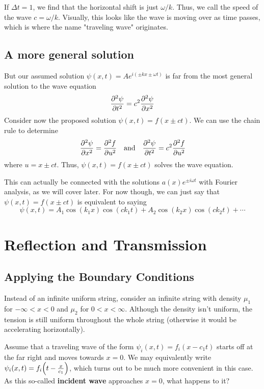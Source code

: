 If $\Delta t=1$, we find that the horizontal shift is just $\omega/k$. Thus, we call the speed of the wave $c = \omega/k$. Visually, this looks like the wave is moving over as time passes, which is where the name "traveling wave" originates.
\subsection*{A more general solution}
But our assumed solution $\psi(x,t) = Ae^{i(\pm kx \pm \omega t)}$ is far from the most general solution to the wave equation
\[ \pdv[2]{\psi}{t} = c^2 \pdv[2]{\psi}{x} \]
Consider now the proposed solution $\psi(x,t) = f(x \pm ct)$. We can use the chain rule to determine
\[ \pdv[2]{\psi}{x} = \pdv[2]{f}{u} \quad\text{and} \quad \pdv[2]{\psi}{t} = c^2\pdv[2]{f}{u}\]
where $u = x\pm ct$. Thus, $\psi(x,t) = f(x \pm ct)$ solves the wave equation.

This can actually be connected with the solutions $a(x)e^{\pm i\omega t}$ with Fourier analysis, as we will cover later. For now though, we can just say that $\psi(x,t) = f(x\pm ct)$ is equivalent to saying
\[ \psi(x,t) = A_1\cos(k_1x)\cos(ck_1 t) + A_2\cos(k_2x)\cos(ck_2t) + \cdots \]
\section{Reflection and Transmission}
\subsection*{Applying the Boundary Conditions}
Instead of an infinite uniform string, consider an infinite string with density $\mu_1$ for $-\infty < x < 0$ and $\mu_2$ for $0 < x < \infty$. Although the density isn't uniform, the tension is still uniform throughout the whole string (otherwise it would be accelerating horizontally).

Assume that a traveling wave of the form $\psi_i(x,t) = f_i(x - c_1t)$ starts off at the far right and moves towards $x=0$. We may equivalently write $\psi_i(x,t) = f_i\pqty{t - \frac{x}{c_1}}$, which turns out to be much more convenient in this case. As this so-called \textbf{incident wave} approaches $x=0$, what happens to it? 

